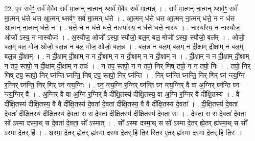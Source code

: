 \documentclass[17pt]{extarticle}
\begin{document}
22. ए॒व सर्वꣳ॒॒ सर्व॑ मे॒वैव सर्व॑ मा॒त्मन् ना॒त्मन् थ्सर्व॑ मे॒वैव सर्व॑ मा॒त्मन्न् । . सर्व॑ मा॒त्मन् ना॒त्मन् थ्सर्वꣳ॒॒ सर्व॑ मा॒त्मन् ध॑त्ते धत्त आ॒त्मन् थ्सर्वꣳ॒॒ सर्व॑ मा॒त्मन् ध॑त्ते । . आ॒त्मन् ध॑त्ते धत्त आ॒त्मन् ना॒त्मन् ध॑त्ते॒ न न ध॑त्त आ॒त्मन् ना॒त्मन् ध॑त्ते॒ न । . ध॒त्ते॒ न न ध॑त्ते धत्ते॒ नास्या᳚स्य॒ न ध॑त्ते धत्ते॒ नास्य॑ । . नास्या᳚स्य॒ न नास्यौज॒ ओजो᳚ ऽस्य॒ न नास्यौजः॑ । . अ॒स्यौज॒ ओजो᳚ ऽस्या॒ स्यौजो॒ बल॒म् बल॒ मोजो᳚ ऽस्या॒ स्यौजो॒ बल᳚म् । . ओजो॒ बल॒म् बल॒ मोज॒ ओजो॒ बल॒न्न न बल॒ मोज॒ ओजो॒ बल॒न्न । . बल॒न्न न बल॒म् बल॒म् न दी॒क्षाम् दी॒क्षाम् न बल॒म् बल॒न्न दी॒क्षाम् । . न दी॒क्षाम् दी॒क्षाम् न न दी॒क्षाम् न न दी॒क्षाम् न न दी॒क्षाम् न । . दी॒क्षाम् न न दी॒क्षाम् दी॒क्षाम् न तप॒ स्तपो॒ न दी॒क्षाम् दी॒क्षाम् न तपः॑ । . न तप॒ स्तपो॒ न न तपो॒ निर् णिष् टपो॒ न न तपो॒ निः । . तपो॒ निर् णिष् टप॒ स्तपो॒ निर् घ्न॑न्ति घ्नन्ति॒ निष् टप॒ स्तपो॒ निर् घ्न॑न्ति । . निर् घ्न॑न्ति घ्नन्ति॒ निर् णिर् घ्न॑ न्त्य॒ग्नि र॒ग्निर् घ्न॑न्ति॒ निर् णिर् घ्न॑ न्त्य॒ग्निः । . घ्न॒ न्त्य॒ग्नि र॒ग्निर् घ्न॑न्ति घ्न न्त्य॒ग्निर् वै वा अ॒ग्निर् घ्न॑न्ति घ्न न्त्य॒ग्निर् वै । . अ॒ग्निर् वै वा अ॒ग्नि र॒ग्निर् वै दी᳚क्षि॒तस्य॑ दीक्षि॒तस्य॒ वा अ॒ग्नि र॒ग्निर् वै दी᳚क्षि॒तस्य॑ । . वै दी᳚क्षि॒तस्य॑ दीक्षि॒तस्य॒ वै वै दी᳚क्षि॒तस्य॑ दे॒वता॑ दे॒वता॑ दीक्षि॒तस्य॒ वै वै दी᳚क्षि॒तस्य॑ दे॒वता᳚ । . दी॒क्षि॒तस्य॑ दे॒वता॑ दे॒वता॑ दीक्षि॒तस्य॑ दीक्षि॒तस्य॑ दे॒वता॒ स स दे॒वता॑ दीक्षि॒तस्य॑ दीक्षि॒तस्य॑ दे॒वता॒ सः । . दे॒वता॒ स स दे॒वता॑ दे॒वता॒ सो᳚ ऽस्मा दस्मा॒थ् स दे॒वता॑ दे॒वता॒ सो᳚ ऽस्मात् । . सो᳚ ऽस्मा दस्मा॒थ् स सो᳚ ऽस्मा दे॒तर् ह्ये॒तर् ह्य॑स्मा॒थ् स सो᳚ ऽस्मा दे॒तर्.हि॑ । . अ॒स्मा॒ दे॒तर् ह्ये॒तर् ह्य॑स्मा दस्मा दे॒तर्.हि॑ ति॒र स्ति॒र ए॒तर् ह्य॑स्मा दस्मा दे॒तर्.हि॑ ति॒रः । \newline
\end{document}
